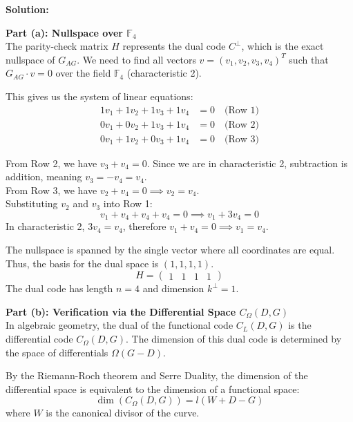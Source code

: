 \documentclass[11pt]{article}
\begin{document}
		\begin{mdframed}[backgroundcolor=gray!5, linecolor=gray!50, linewidth=1pt]
			\textbf{Solution:}
			
			\vspace{0.3cm}
			\textbf{Part (a): Nullspace over $\mathbb{F}_4$} \\
			The parity-check matrix $H$ represents the dual code $C^\perp$, which is the exact nullspace of $G_{AG}$. We need to find all vectors $v = (v_1, v_2, v_3, v_4)^T$ such that $G_{AG} \cdot v = 0$ over the field $\mathbb{F}_4$ (characteristic 2).
			
			This gives us the system of linear equations:
			\begin{align*}
				1v_1 + 1v_2 + 1v_3 + 1v_4 &= 0 \quad \text{(Row 1)} \\
				0v_1 + 0v_2 + 1v_3 + 1v_4 &= 0 \quad \text{(Row 2)} \\
				0v_1 + 1v_2 + 0v_3 + 1v_4 &= 0 \quad \text{(Row 3)}
			\end{align*}
			
			From Row 2, we have $v_3 + v_4 = 0$. Since we are in characteristic 2, subtraction is addition, meaning $v_3 = -v_4 = v_4$. \\
			From Row 3, we have $v_2 + v_4 = 0 \implies v_2 = v_4$. \\
			Substituting $v_2$ and $v_3$ into Row 1:
			$$ v_1 + v_4 + v_4 + v_4 = 0 \implies v_1 + 3v_4 = 0 $$
			In characteristic 2, $3v_4 = v_4$, therefore $v_1 + v_4 = 0 \implies v_1 = v_4$.
			
			The nullspace is spanned by the single vector where all coordinates are equal. Thus, the basis for the dual space is $(1, 1, 1, 1)$. 
			$$ H = \begin{pmatrix} 1 & 1 & 1 & 1 \end{pmatrix} $$
			The dual code has length $n=4$ and dimension $k^\perp = 1$.
			
			\vspace{0.3cm}
			\textbf{Part (b): Verification via the Differential Space $C_\Omega(D, G)$} \\
			In algebraic geometry, the dual of the functional code $C_L(D, G)$ is the differential code $C_\Omega(D, G)$. The dimension of this dual code is determined by the space of differentials $\Omega(G - D)$.
			
			By the Riemann-Roch theorem and Serre Duality, the dimension of the differential space is equivalent to the dimension of a functional space:
			$$ \dim(C_\Omega(D, G)) = l(W + D - G) $$
			where $W$ is the canonical divisor of the curve. 
			

\end{mdframed}
\end{document}
